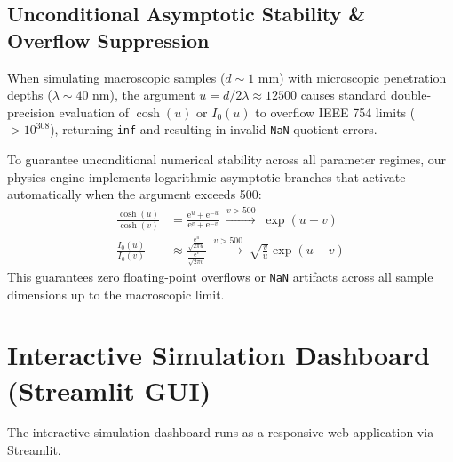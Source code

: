 \documentclass[11pt,a4paper]{article}
\begin{document}
\subsection{Unconditional Asymptotic Stability \& Overflow Suppression}
When simulating macroscopic samples ($d \sim 1\text{ mm}$) with microscopic penetration depths ($\lambda \sim 40\text{ nm}$), the argument $u = d / 2\lambda \approx 12500$ causes standard double-precision evaluation of $\cosh(u)$ or $I_0(u)$ to overflow IEEE 754 limits ($> 10^{308}$), returning \texttt{inf} and resulting in invalid \texttt{NaN} quotient errors.

To guarantee unconditional numerical stability across all parameter regimes, our physics engine implements logarithmic asymptotic branches that activate automatically when the argument exceeds 500:
\begin{align}
    \frac{\cosh(u)}{\cosh(v)} &= \frac{\mathrm{e}^u + \mathrm{e}^{-u}}{\mathrm{e}^v + \mathrm{e}^{-v}} \;\xrightarrow{v > 500}\; \exp(u - v) \\
    \frac{I_0(u)}{I_0(v)} &\approx \frac{\frac{\mathrm{e}^u}{\sqrt{2\pi u}}}{\frac{\mathrm{e}^v}{\sqrt{2\pi v}}} \;\xrightarrow{v > 500}\; \sqrt{\frac{v}{u}} \exp(u - v)
\end{align}
This guarantees zero floating-point overflows or \texttt{NaN} artifacts across all sample dimensions up to the macroscopic limit.

\section{Interactive Simulation Dashboard (Streamlit GUI)}

The interactive simulation dashboard runs as a responsive web application via Streamlit.
\end{document}
